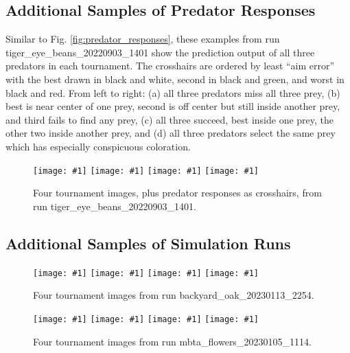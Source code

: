 \documentclass[letterpaper]{article}
\newcommand{\runID}{\footnotesize}
\newcommand{\igfour}[1]{\texttt{[image: \#1]}}
\begin{document}
\newpage 

\subsection{Additional Samples of Predator Responses}
Similar to Fig. \ref{fig:predator_responses}, these examples from run {\runID tiger\_eye\_beans\_20220903\_1401} show the prediction output of all three predators in each tournament. The crosshairs are ordered by least “aim error” with the best drawn in black and white, second in black and green, and worst in black and red. From left to right: (a) all three predators miss all three prey, (b) best is near center of one prey, second is off center but still inside another prey, and third fails to find any prey, (c) all three succeed, best inside one prey, the other two inside another prey, and (d) all three predators select the same prey which has especially conspicuous coloration.
\par

\begin{figure}[H]
    \igfour{20220904_step_4883.png}
    \hfill
    \igfour{20220904_step_4788.png}
    \hfill
    \igfour{20220904_step_3914.png}
    \hfill
    \igfour{20220904_step_4636.png}
    \caption{Four tournament images, plus predator responses as crosshairs, from run {\runID tiger\_eye\_beans\_20220903\_1401}.}
    \label{fig:tiger_eye_beans_4x}
\end{figure}


\subsection{Additional Samples of Simulation Runs}

\begin{figure}[H]
    \igfour{20230115_step_6902.png}
    \hfill
    \igfour{20230115_step_7682.png}
    \hfill
    \igfour{20230115_step_7942.png}
    \hfill
    \igfour{20230115_step_12413.png}
    \caption{Four tournament images from run {\runID backyard\_oak\_20230113\_2254}.}
    \label{fig:backyard_oak_4x}
\end{figure}

\begin{figure}[H]
    \igfour{20230106_step_11019.png}
    \hfill
    \igfour{20230106_step_11204.png}
    \hfill
    \igfour{20230106_step_11689.png}
    \hfill
    \igfour{20230106_step_11995.png}
    \caption{Four tournament images from run {\runID mbta\_flowers\_20230105\_1114}.}
    \label{fig:mbta_flowers_4x}
\end{figure}
\end{document}
